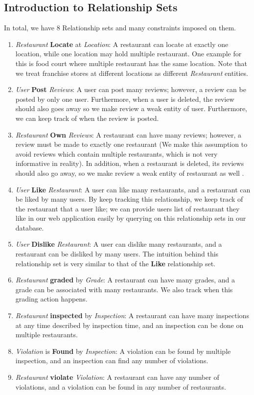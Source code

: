 \documentclass[a4paper,12pt]{article}
\theoremstyle{definition}
\begin{document}
\subsection{Introduction to Relationship Sets}
In total, we have $8$ Relationship sets and many constraints imposed on them.
\begin{enumerate}
    \item \textit{Restaurant} \textbf{Locate} at \textit{Location}: A restaurant can locate at exactly one location, while one location may hold multiple restaurant. One example for this is food court where multiple restaurant has the same location. Note that we treat franchise stores at different locations as different \textit{Restaurant} entities.
    \item \textit{User} \textbf{Post} \textit{Reviews}: A user can post many reviews; however, a review can be posted by only one user. Furthermore, when a user is deleted, the review should also goes away so we make review a weak entity of user. Furthermore, we can keep track of when the review is posted.
    \item \textit{Restaurant} \textbf{Own} \textit{Reviews}: A restaurant can have many reviews; however, a review must be made to exactly one restaurant (We make this assumption to avoid reviews which contain multiple restaurants, which is not very informative in reality). In addition, when a restaurant is deleted, its reviews should also go away, so we make review a weak entity of restaurant as well \footnotemark[3]. 
    \item \textit{User} \textbf{Like} \textit{Restaurant}: A user can like many restaurants, and a restaurant can be liked by many users. By keep tracking this relationship, we keep track of the restaurant that a user like; we can provide users list of restaurant they like in our web application easily by querying on this relationship sets in our database.
    \item \textit{User} \textbf{Dislike} \textit{Restaurant}: A user can dislike many restaurants, and a restaurant can be disliked by many users. The intuition behind this relationship set is very similar to that of the \textbf{Like} relationship set.
    \item \textit{Restaurant} \textbf{graded} by \textit{Grade}: A restaurant can have many grades, and a grade can be associated with many restaurants. We also track when this grading action happens.
    \item \textit{Restaurant} \textbf{inspected} by \textit{Inspection}: A restaurant can have many inspections at any time described by inspection time, and an inspection can be done on multiple restaurants. 
    \item \textit{Violation} is \textbf{Found} by \textit{Inspection}: A violation can be found by multiple inspection, and an inspection can find any number of violations. 
    \item \textit{Restaurant} \textbf{violate} \textit{Violation}: A restaurant can have any number of violations, and a violation can be found in any number of restaurants.
\end{enumerate}
\end{document}
